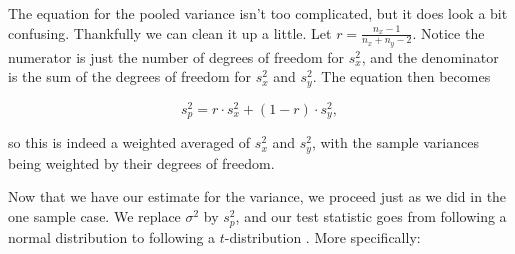 \begin{table}[h]

\begin{center}


\end{center}

\end{table}



The equation for the pooled variance isn't too complicated, but it does look a bit confusing.  Thankfully we can clean it up a little.  Let $r = \frac{n_x - 1}{n_x + n_y - 2}$.  Notice the numerator is just the number of degrees of freedom for $s^2_x$, and the denominator is the sum of the degrees of freedom for $s^2_x$ and $s^2_y$.  The equation then becomes



\begin{equation*}

s^2_p = r\cdot s^2_x + (1-r)\cdot s^2_y,

\end{equation*}

so this is indeed a weighted averaged of $s^2_x$ and $s^2_y$, with the sample variances being weighted by their degrees of freedom.



Now that we have our estimate for the variance, we proceed just as we did in the one sample case.  We replace $\sigma^2$ by $s^2_p$, and our test statistic goes from following a normal distribution to following a $t$-distribution  .  More specifically:



